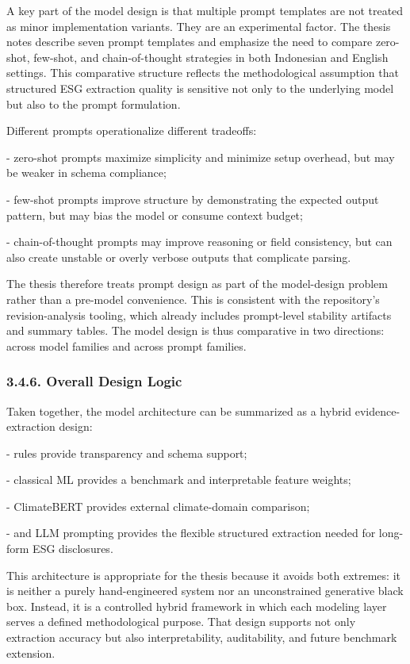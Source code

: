 \documentclass{article}
\begin{document}
A key part of the model design is that multiple prompt templates are not treated as minor implementation variants. They are an experimental factor. The thesis notes describe seven prompt templates and emphasize the need to compare zero-shot, few-shot, and chain-of-thought strategies in both Indonesian and English settings. This comparative structure reflects the methodological assumption that structured ESG extraction quality is sensitive not only to the underlying model but also to the prompt formulation.

Different prompts operationalize different tradeoffs:

- zero-shot prompts maximize simplicity and minimize setup overhead, but may be weaker in schema compliance;

- few-shot prompts improve structure by demonstrating the expected output pattern, but may bias the model or consume context budget;

- chain-of-thought prompts may improve reasoning or field consistency, but can also create unstable or overly verbose outputs that complicate parsing.

The thesis therefore treats prompt design as part of the model-design problem rather than a pre-model convenience. This is consistent with the repository’s revision-analysis tooling, which already includes prompt-level stability artifacts and summary tables. The model design is thus comparative in two directions: across model families and across prompt families.
\subsubsection*{ 3.4.6. Overall Design Logic}

Taken together, the model architecture can be summarized as a hybrid evidence-extraction design:

- rules provide transparency and schema support;

- classical ML provides a benchmark and interpretable feature weights;

- ClimateBERT provides external climate-domain comparison;

- and LLM prompting provides the flexible structured extraction needed for long-form ESG disclosures.

This architecture is appropriate for the thesis because it avoids both extremes: it is neither a purely hand-engineered system nor an unconstrained generative black box. Instead, it is a controlled hybrid framework in which each modeling layer serves a defined methodological purpose. That design supports not only extraction accuracy but also interpretability, auditability, and future benchmark extension.
\end{document}

